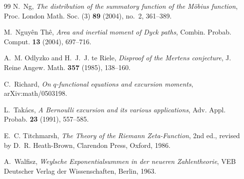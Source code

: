 \documentclass[11pt]{amsart}
\numberwithin{equation}{section}
\theoremstyle{plain}
\theoremstyle{definition}
\theoremstyle{remark}
\begin{document}
\begin{thebibliography}{99}
N.~Ng, \emph{The distribution of the summatory function of the M\"obius
function}, Proc. London Math. Soc. (3) \textbf{89} (2004), no.~2, 361--389.

M.~Nguy\^en Th\^e, \emph{Area and inertial moment of Dyck paths}, Combin.
Probab. Comput. \textbf{13} (2004), 697--716.

A.~M. Odlyzko and H.~J.~J. te Riele, \emph{Disproof of the Mertens
conjecture}, J. Reine Angew. Math. \textbf{357} (1985), 138--160.

C.~Richard, \emph{On $q$-functional equations and excursion moments},
arXiv:math/0503198.

L.~Tak\'acs, \emph{A Bernoulli excursion and its various applications},
Adv. Appl. Probab. \textbf{23} (1991), 557--585.

E.~C. Titchmarsh, \emph{The Theory of the Riemann Zeta-Function}, 2nd ed.,
revised by D.~R. Heath-Brown, Clarendon Press, Oxford, 1986.

A.~Walfisz, \emph{Weylsche Exponentialsummen in der neueren Zahlentheorie},
VEB Deutscher Verlag der Wissenschaften, Berlin, 1963.

\end{thebibliography}
\end{document}
